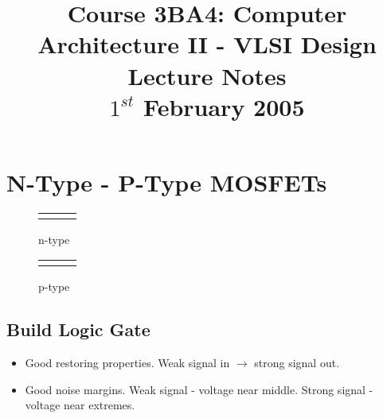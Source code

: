 \documentclass[a4paper,12pt]{article}
\begin{document}
\title{Course 3BA4: Computer Architecture II - VLSI Design \\ Lecture Notes \\ $1^{st}$ February 2005}

\maketitle

\section*{N-Type - P-Type MOSFETs}

\begin{figure}[hbtp]

\begin{tabular}{ccc}

 &

	&

	\\

\end{tabular}

\caption{n-type}

\end{figure}

\begin{figure}[hbtp]

\begin{tabular}{ccc}

	&

	&

	\\

\end{tabular}

\caption{p-type}

\end{figure}

\subsection*{Build Logic Gate}

\begin{itemize}

\item Good restoring properties. Weak signal in $\to$ strong signal out.

\item Good noise margins. Weak signal - voltage near middle. Strong
signal - voltage near extremes.

\end{itemize}
\end{document}
